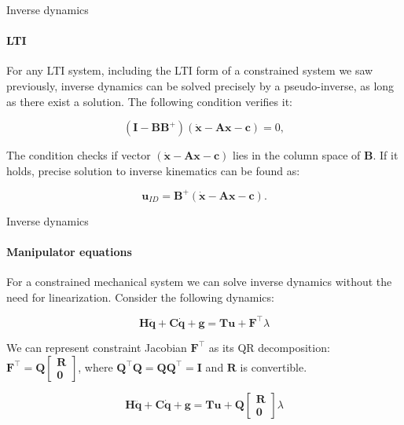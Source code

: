 \documentclass{beamer}
\begin{document}
\begin{frame}{Inverse dynamics}
\framesubtitle{LTI}
\begin{flushleft}

For any LTI system, including the LTI form of a constrained system we saw previously, inverse dynamics can be solved precisely by a pseudo-inverse, as long as there exist a solution. The following condition verifies it:

\begin{equation}
    (\mathbf{I} - \mathbf{B}\mathbf{B}^+)(\dot{\mathbf{x}} - \mathbf{A} \mathbf{x} - \mathbf{c}) = 0,
\end{equation}

The condition checks if vector $(\dot{\mathbf{x}} - \mathbf{A} \mathbf{x} - \mathbf{c})$ lies in the column space of $\mathbf{B}$. If it holds, precise solution to inverse kinematics can be found as:

\begin{equation}
    \mathbf{u}_{ID} = \mathbf{B}^+(\dot{\mathbf{x}} - \mathbf{A} \mathbf{x} - \mathbf{c}).
\end{equation}

\end{flushleft}
\end{frame}



\begin{frame}{Inverse dynamics}
\framesubtitle{Manipulator equations}
\begin{flushleft}

For a constrained mechanical system we can solve inverse dynamics without the need for linearization. Consider the following dynamics:

\begin{equation}
    \mathbf{H}\ddot{\mathbf{q}} + \mathbf{C}\dot{\mathbf{q}} + \mathbf{g} = \mathbf{T}\mathbf{u} + \mathbf{F}^\top \lambda
\end{equation}

We can represent constraint Jacobian $\mathbf{F}^\top$ as its QR decomposition: $\mathbf{F}^\top = \mathbf{Q} \begin{bmatrix} \mathbf{R} \\ \mathbf{0}  \end{bmatrix}$, where $\mathbf{Q}^\top \mathbf{Q} = \mathbf{Q} \mathbf{Q}^\top = \mathbf{I}$ and $\mathbf{R}$ is convertible.

\begin{equation}
    \mathbf{H}\ddot{\mathbf{q}} + \mathbf{C}\dot{\mathbf{q}} + \mathbf{g} = \mathbf{T}\mathbf{u} + \mathbf{Q} \begin{bmatrix} \mathbf{R} \\ \mathbf{0}  \end{bmatrix} \lambda
\end{equation}


\end{flushleft}
\end{frame}
\end{document}
